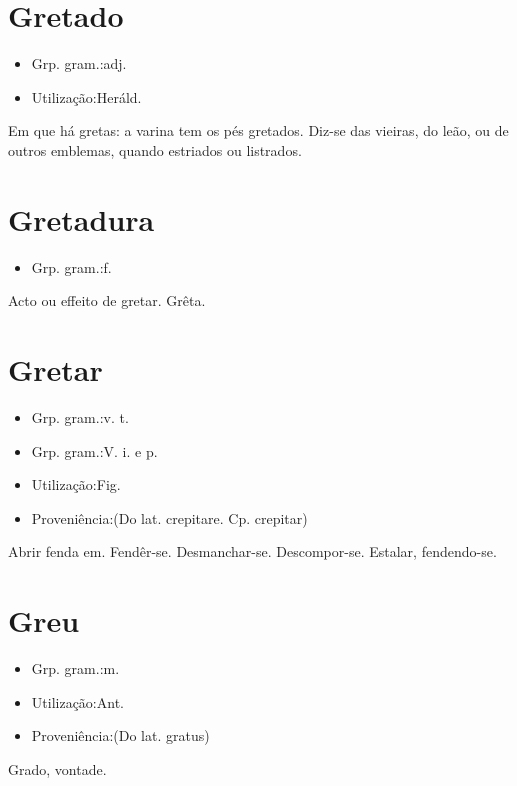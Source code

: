 \section{Gretado}
\begin{itemize}
\item {Grp. gram.:adj.}
\end{itemize}
\begin{itemize}
\item {Utilização:Heráld.}
\end{itemize}
Em que há gretas: \textunderscore a varina tem os pés gretados\textunderscore .
Diz-se das vieiras, do leão, ou de outros emblemas, quando estriados ou listrados.
\section{Gretadura}
\begin{itemize}
\item {Grp. gram.:f.}
\end{itemize}
Acto ou effeito de gretar.
Grêta.
\section{Gretar}
\begin{itemize}
\item {Grp. gram.:v. t.}
\end{itemize}
\begin{itemize}
\item {Grp. gram.:V. i.  e  p.}
\end{itemize}
\begin{itemize}
\item {Utilização:Fig.}
\end{itemize}
\begin{itemize}
\item {Proveniência:(Do lat. \textunderscore crepitare\textunderscore . Cp. \textunderscore crepitar\textunderscore )}
\end{itemize}
Abrir fenda em.
Fendêr-se.
Desmanchar-se.
Descompor-se.
Estalar, fendendo-se.
\section{Greu}
\begin{itemize}
\item {Grp. gram.:m.}
\end{itemize}
\begin{itemize}
\item {Utilização:Ant.}
\end{itemize}
\begin{itemize}
\item {Proveniência:(Do lat. \textunderscore gratus\textunderscore )}
\end{itemize}
Grado, vontade.
